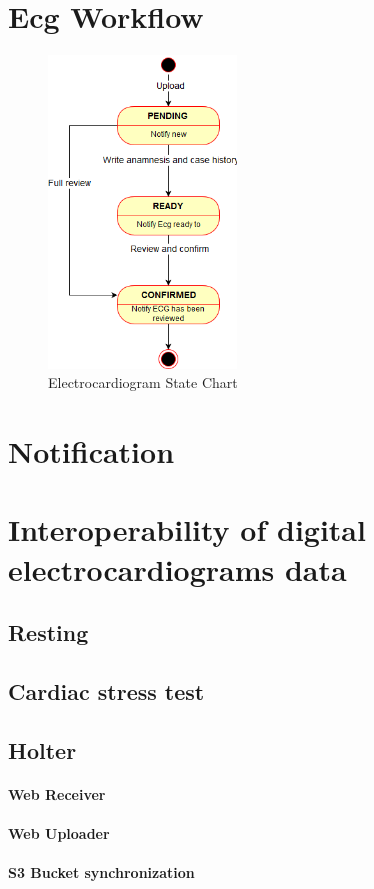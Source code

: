 \section{Ecg Workflow}
\begin{figure}[h]
    \includegraphics[width=5cm]{ECGstatechart}
    \caption{Electrocardiogram State Chart}
    \label{fig:ECGstatechart}
\end{figure}
\section{Notification}
\section{Interoperability of digital electrocardiograms data}
\subsection{Resting}
\subsection{Cardiac stress test}
\subsection{Holter}
\paragraph{Web Receiver}
\label{par:webreceiver}

\paragraph{Web Uploader}
\paragraph{S3 Bucket synchronization}